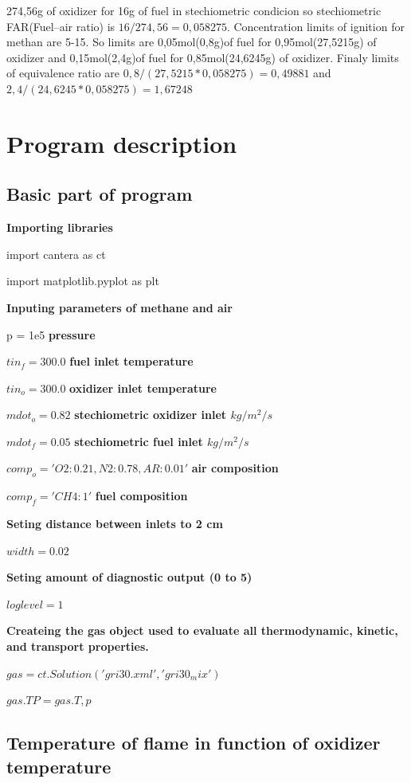 \documentclass[a4paper]{article}
\begin{document}
274,56g of oxidizer for 16g of fuel in stechiometric condicion so stechiometric FAR(Fuel–air ratio) is $16/274,56=0,058275$. Concentration limits of ignition for methan are 5-15. So limits are 0,05mol(0,8g)of fuel for 0,95mol(27,5215g) of oxidizer and 0,15mol(2,4g)of fuel for 0,85mol(24,6245g) of oxidizer. Finaly limits of equivalence ratio are $0,8/(27,5215*0,058275)=0,49881$ and $2,4/(24,6245*0,058275)=1,67248$

\section{Program description}
\subsection{Basic part of program}

\textbf{Importing libraries}

import cantera as ct

import matplotlib.pyplot as plt

\textbf{Inputing parameters of methane and air}

p = 1e5   \textbf{pressure}

$tin_f = 300.0$   \textbf{fuel inlet temperature}

$tin_o = 300.0$   \textbf{oxidizer inlet temperature}

$mdot_o = 0.82$   \textbf{stechiometric oxidizer inlet $kg/m^2/s$}

$mdot_f = 0.05$   \textbf{stechiometric fuel inlet $kg/m^2/s$}

$comp_o = 'O2:0.21, N2:0.78, AR:0.01'$   \textbf{air composition}

$comp_f = 'CH4:1'$   \textbf{fuel composition}

\textbf{Seting distance between inlets to 2 cm}

$width = 0.02$

\textbf{Seting amount of diagnostic output (0 to 5)}

$loglevel = 1$

\textbf{Createing the gas object used to evaluate all thermodynamic, kinetic, and transport properties.}

$gas = ct.Solution('gri30.xml', 'gri30_mix')$

$gas.TP = gas.T, p$

\subsection{Temperature of flame in function of oxidizer temperature}
\end{document}
